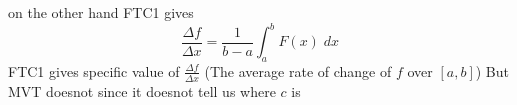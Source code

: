    on the other hand FTC1 gives 
      \[
   	\frac{\Delta{f}}{\Delta{x}} = \frac{1}{b-a} \int_{a}^{b} F(x) \; dx
      \]
      FTC1 gives specific value of $\frac{\Delta{f}}{\Delta{x}}$ (The 
      average rate of change of $f$ over $[a,b]$) But MVT doesnot 
      since it doesnot tell us where $c$ is 

